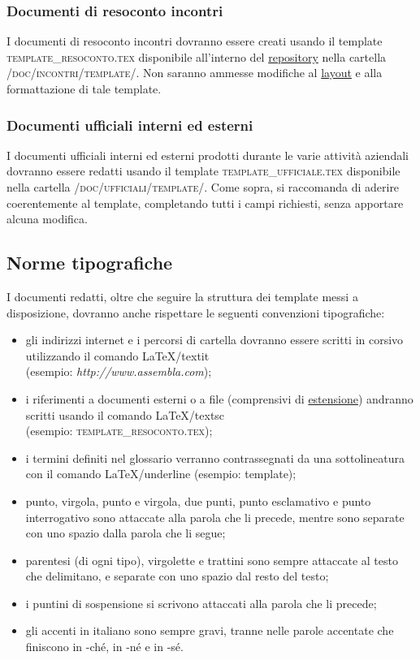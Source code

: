 \documentclass[11pt,a4paper]{article}
\begin{document}
\subsubsection{Documenti di resoconto incontri}
I documenti di resoconto incontri dovranno essere creati usando il template \textsc{template\_resoconto.tex} disponibile all'interno del \underline{repository} nella car\-tella \textsc{/doc/incontri/template/}. Non saranno ammesse modifiche al \underline{layout} e alla formattazione di tale template.
\subsubsection{Documenti ufficiali interni ed esterni}
I documenti ufficiali interni ed esterni prodotti durante le varie attività aziendali dovranno essere redatti usando il template \textsc{template\_ufficiale.tex} disponibile nella cartella \textsc{/doc/ufficiali/template/}.
Come sopra, si raccomanda di aderire coerentemente al template, completando tutti i campi richiesti, senza apportare alcuna modifica.
\subsection{Norme tipografiche}
I documenti redatti, oltre che seguire la struttura  dei template messi a disposizione, dovranno anche rispettare le seguenti convenzioni tipografiche:
\begin{itemize}
	\item gli indirizzi internet e i percorsi di cartella dovranno essere scritti in corsivo utilizzando il comando \LaTeX \space /textit 
\\ (esempio: \textit{http://www.assembla.com});
	\item i riferimenti a documenti esterni o a file (comprensivi di \underline{estensione}) andranno scritti usando il comando \LaTeX \space /textsc 
\\ (esempio: \textsc{template\_resoconto.tex});
	\item i termini definiti nel glossario verranno contrassegnati da una sottolineatura con il comando \LaTeX \space /underline (esempio: template);
	\item punto, virgola, punto e virgola, due punti, punto esclamativo e punto interrogativo sono attaccate alla parola che li precede, mentre sono separate con uno spazio dalla parola che li segue;
	\item parentesi (di ogni tipo), virgolette e trattini sono sempre attaccate al testo che delimitano, e separate con uno spazio dal resto del testo;
	\item i puntini di sospensione si scrivono attaccati alla parola che li precede;
	\item gli accenti in italiano sono sempre gravi, tranne nelle parole accentate che finiscono in -ché, in -né e in -sé.
\end{itemize}
\end{document}
